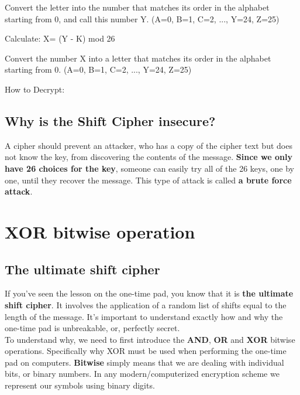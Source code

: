 \documentclass{report}
\begin{document}
\begin{algorithm}[H]
	\SetAlgoLined
	\SetNoFillComment
	\vspace{3mm}
	Convert the letter into the number that matches its order in the alphabet starting from 0, and call this number Y.
	(A=0, B=1, C=2, ..., Y=24, Z=25)
	
	
	Calculate: X= (Y - K) mod 26
	
	Convert the number X into a letter that matches its order in the alphabet starting from 0.
	(A=0, B=1, C=2, ..., Y=24, Z=25)
	
	
	\caption{How to Decrypt:}
\end{algorithm}

\subsection{Why is the Shift Cipher insecure?}
A cipher should prevent an attacker, who has a copy of the cipher text but does not know the key, from discovering the contents of the message.\textbf{ Since we only have 26 choices for the key}, someone can easily try all of the 26 keys, one by one, until they recover the message. This type of attack is called \textbf{a brute force attack}.

\section{XOR bitwise operation}
\subsection{The ultimate shift cipher}

If you’ve seen the lesson on the one-time pad, you know that it is \textbf{the ultimate shift cipher}. It involves the application of a random list of shifts equal to the length of the message. It’s important to understand exactly how and why the one-time pad is unbreakable, or, perfectly secret.\\
To understand why, we need to first introduce the \textbf{AND}, \textbf{OR} and \textbf{XOR} bitwise operations. Specifically why XOR must be used when performing the one-time pad on computers. \textbf{Bitwise} simply means that we are dealing with individual bits, or binary numbers. In any modern/computerized encryption scheme we represent our symbols using binary digits. 
\end{document}
